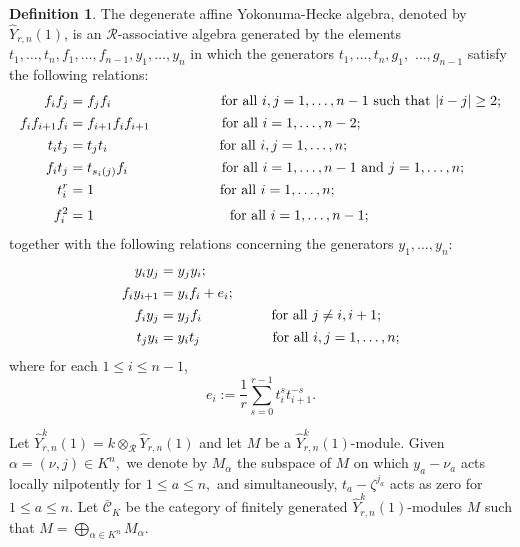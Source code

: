 \documentclass[11pt, reqno]{amsart} \textwidth=14.9cm \oddsidemargin=1cm \evensidemargin=1cm
\theoremstyle{definition}
\newtheorem{definition}[theorem]{Definition}
\numberwithin{equation}{section}
\begin{document}
\begin{definition}
The degenerate affine Yokonuma-Hecke algebra, denoted by $\widehat{Y}_{r,n}(1)$, is an $\mathcal{R}$-associative algebra generated by the elements $t_{1},\ldots,t_{n},f_{1},\ldots,f_{n-1},y_1,\ldots, y_{n}$ in which the generators $t_{1},\ldots,t_{n},g_{1},$ $\ldots,g_{n-1}$ satisfy the following relations:
\begin{align}
f_if_j&=f_jf_i \qquad \qquad\qquad\quad\hspace{0.3cm}\mbox{for all $i,j=1,\ldots,n-1$ such that $\vert i-j\vert \geq 2$;}\label{drel-def-Y1}\\[0.1em]
f_if_{i+1}f_i&=f_{i+1}f_if_{i+1} \qquad \quad\qquad\hspace{0.05cm}\mbox{for all $i=1,\ldots,n-2$;}\label{drel-def-Y2}\\[0.1em]
t_it_j&=t_jt_i \qquad\qquad\qquad\qquad  \mbox{for all $i,j=1,\ldots,n$;}\label{drel-def-Y3}\\[0.1em]
f_it_j&=t_{s_i(j)}f_i \quad \quad\qquad\qquad\hspace{0.25cm}\mbox{for all $i=1,\ldots,n-1$ and $j=1,\ldots,n$;}\label{drel-def-Y4}\\[0.1em]
t_i^r&=1 \quad \qquad\qquad\qquad\qquad\mbox{for all $i=1,\ldots,n$;}\label{drel-def-Y5}\\[0.2em]
f_{i}^{2}&=1 \qquad \hspace{2.71cm}\mbox{for all $i=1,\ldots,n-1$;}\label{drel-def-Y6}
\end{align}
together with the following relations concerning the generators $y_1,\ldots, y_{n}$:
\begin{align}
y_{i}y_{j}&=y_{j}y_{i};\label{drel-def-Y7}\\[0.1em]
f_{i}y_{i+1}&=y_{i}f_{i}+e_{i};\label{drel-def-Y8}\\[0.1em]
f_{i}y_{j}&=y_{j}f_{i} \qquad \qquad \quad\mbox{for all $j\neq i, i+1$;}\label{drel-def-Y9}\\[0.1em]
t_{j}y_{i}&=y_{i}t_{j} \hspace{0.07cm}\qquad \qquad\quad\mbox{for all $i, j=1,\ldots,n$;}\label{drel-def-Y10}
\end{align}
where for each $1\leq i\leq n-1$,
$$e_{i} :=\frac{1}{r}\sum\limits_{s=0}^{r-1}t_{i}^{s}t_{i+1}^{-s}.$$
\end{definition}

Let $\widehat{Y}_{r,n}^{k}(1)=k\otimes_{\mathcal{R}}\widehat{Y}_{r,n}(1)$ and let $M$ be a $\widehat{Y}_{r,n}^{k}(1)$-module. Given $\alpha=(\nu, j)\in K^{n},$ we denote by $M_{\alpha}$ the subspace of $M$ on which $y_{a}-\nu_{a}$ acts locally nilpotently for $1\leq a\leq n,$ and simultaneously, $t_{a}-\zeta^{j_{a}}$ acts as zero for $1\leq a\leq n.$ Let $\bar{\mathcal{C}}_{K}$ be the category of finitely generated $\widehat{Y}_{r,n}^{k}(1)$-modules $M$ such that $M=\bigoplus_{\alpha\in K^{n}}M_{\alpha}.$
\end{document}
